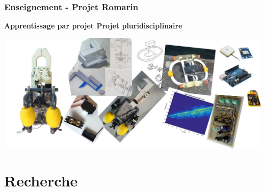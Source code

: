 \documentclass[usenames,dvipsnames,xcolor=table]{beamer}
\begin{document}
\begin{frame}
    \frametitle{Enseignement - Projet Romarin}
    \vspace{-10pt}
    \begin{center}
    \textbf{\textbullet Apprentissage par projet \hspace{20pt} \textbullet Projet pluridisciplinaire} \\
    \bigskip
    
    \includegraphics[width=1.\linewidth]{romarin4.png}
    \end{center}
   
    
\end{frame}


\section{Recherche}
\end{document}
